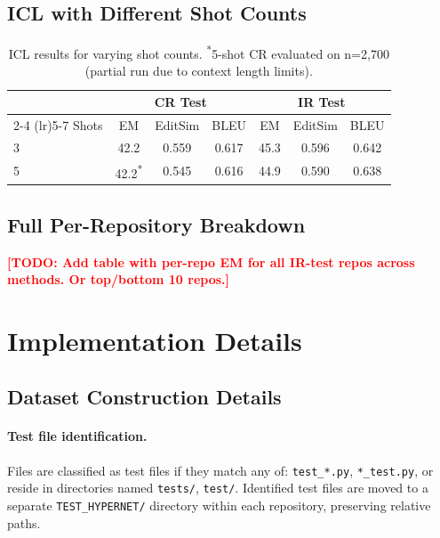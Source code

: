 \documentclass[11pt]{article}
\newcommand{\todo}[1]{\textcolor{red}{\textbf{[TODO: #1]}}}
\begin{document}
\subsection{ICL with Different Shot Counts}

\begin{table}[h]
\centering
\small
\begin{tabular}{lccc@{\hskip 12pt}ccc}
\toprule
& \multicolumn{3}{c}{CR Test} & \multicolumn{3}{c}{IR Test} \\
\cmidrule(lr){2-4} \cmidrule(lr){5-7}
Shots & EM & EditSim & BLEU & EM & EditSim & BLEU \\
\midrule
3 & 42.2 & 0.559 & 0.617 & 45.3 & 0.596 & 0.642 \\
5 & 42.2\textsuperscript{*} & 0.545 & 0.616 & 44.9 & 0.590 & 0.638 \\
\bottomrule
\end{tabular}
\caption{ICL results for varying shot counts. \textsuperscript{*}5-shot CR evaluated on n=2,700 (partial run due to context length limits).}
\label{tab:icl_shots}
\end{table}

\subsection{Full Per-Repository Breakdown}
\label{app:per_repo}

\todo{Add table with per-repo EM for all IR-test repos across methods. Or top/bottom 10 repos.}

\section{Implementation Details}
\label{app:implementation}

\subsection{Dataset Construction Details}

\paragraph{Test file identification.}
Files are classified as test files if they match any of:
\texttt{test\_*.py}, \texttt{*\_test.py}, or reside in directories named \texttt{tests/}, \texttt{test/}.
Identified test files are moved to a separate \texttt{TEST\_HYPERNET/} directory within each repository, preserving relative paths.
\end{document}
